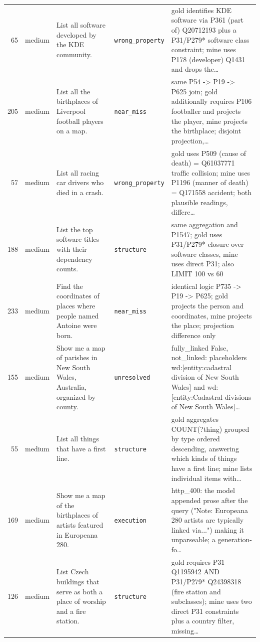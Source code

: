 \begin{longtable}{@{}r >{\raggedright\arraybackslash}p{1.7cm} >{\raggedright\arraybackslash}p{4.6cm} >{\raggedright\arraybackslash}p{2.5cm} >{\raggedright\arraybackslash}p{4.4cm}@{}}
65 & medium & List all software developed by the KDE community. & \texttt{wrong\_property} & gold identifies KDE software via P361 (part of) Q20712193 plus a P31/\allowbreak{}P279* software class constraint; mine uses P178 (developer) Q1431 and drops the\ldots{} \\
205 & medium & List all the birthplaces of Liverpool football players on a map. & \texttt{near\_miss} & same P54 -> P19 -> P625 join; gold additionally requires P106 footballer and projects the player, mine projects the birthplace; disjoint projection,\ldots{} \\
57 & medium & List all racing car drivers who died in a crash. & \texttt{wrong\_property} & gold uses P509 (cause of death) = Q61037771 traffic collision; mine uses P1196 (manner of death) = Q171558 accident; both plausible readings, differe\ldots{} \\
188 & medium & List the top software titles with their dependency counts. & \texttt{structure} & same aggregation and P1547; gold uses P31/\allowbreak{}P279* closure over software classes, mine uses direct P31; also LIMIT 100 vs 60 \\
233 & medium & Find the coordinates of places where people named Antoine were born. & \texttt{near\_miss} & identical logic P735 -> P19 -> P625; gold projects the person and coordinates, mine projects the place; projection difference only \\
155 & medium & Show me a map of parishes in New South Wales, Australia, organized by county. & \texttt{unresolved} & fully\_linked False, not\_linked: placeholders wd:[entity:cadastral division of New South Wales] and wd:[entity:Cadastral divisions of New South Wales]\ldots{} \\
55 & medium & List all things that have a first line. & \texttt{structure} & gold aggregates COUNT(?thing) grouped by type ordered descending, answering which kinds of things have a first line; mine lists individual items with\ldots{} \\
169 & medium & Show me a map of the birthplaces of artists featured in Europeana 280. & \texttt{execution} & http\_400: the model appended prose after the query ("Note: Europeana 280 artists are typically linked via...") making it unparseable; a generation-fo\ldots{} \\
126 & medium & List Czech buildings that serve as both a place of worship and a fire station. & \texttt{structure} & gold requires P31 Q1195942 AND P31/\allowbreak{}P279* Q24398318 (fire station and subclasses); mine uses two direct P31 constraints plus a country filter, missing\ldots{} \\

\end{longtable}
